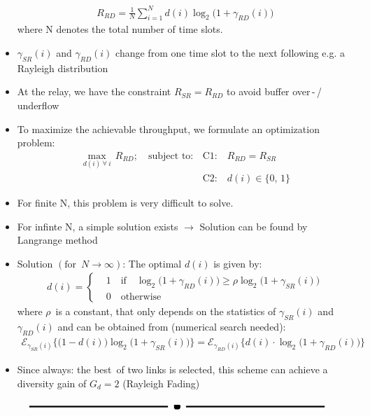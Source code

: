 \documentclass[a4paper, 10pt]{article}
\begin{document}
\begin{itemize}
	\begin{align*}
		R_{RD} = \frac{1}{N}\sum_{i=1}^{N}d(i)\log_2\bigl(1 + \gamma_{RD}(i)\bigr)
	\end{align*}
	where N denotes the total number of time slots.
	\item $\gamma_{SR}(i) $ and $ \gamma_{RD}(i) $ change from one time slot to the next following e.g. a Rayleigh distribution
	\item At the relay, we have the constraint $ R_{SR} = R_{RD} $ to avoid buffer over\,-\,/\,underflow
	\item To maximize the achievable throughput, we formulate an optimization problem:
	\begin{align*}
		\underset{d(i)\ \forall\ i}{\max}\, R_{RD};\quad
		\text{subject to:}\, &\text{C1:}\quad R_{RD} = R_{SR} \\
		&\text{C2:}\quad d(i) \in \{0,\,1\}
	\end{align*}
	\item For finite N, this problem is very difficult to solve.
	\item For infinte N, a simple solution exists $\rightarrow$ Solution can be found by Langrange method
	\item Solution $(\text{for }\, N \rightarrow \infty )$: The optimal $d(i) $ is given by:
	\begin{align*}
		d(i) = 
		\begin{cases}
			&1\quad \text{if}\quad \log_2\bigl( 1 + \gamma_{RD}(i)\bigr) \geq \rho \log_2\bigl( 1 + \gamma_{SR}(i)\bigr) \\
			&0\quad \text{otherwise} 
		\end{cases}
\end{align*}	 
	where $\rho $\, is a constant, that only depends on the statistics of $\gamma_{SR}(i) $ and $ \gamma_{RD}(i) $ and can be obtained from (numerical search needed):
	\begin{align*}
		\mathcal{E}_{\gamma_{SR}(i)}\bigl\{\bigl(1 - d(i)\bigr)\log_2\bigl(1 + \gamma_{SR}(i)\bigr)\bigr\} = \mathcal{E}_{\gamma_{RD}(i)}\bigl\{d(i)\cdot\log_2\bigl(1 + \gamma_{RD}(i)\bigr)\bigr\}
	\end{align*}
	\item Since always: the \glqq best\grqq\ of two links is selected, this scheme can achieve a diversity gain of $G_d = 2 $ (Rayleigh Fading)
\end{itemize}
\begin{figure}[ht]
	\centering
	\includegraphics[scale=1.4]{Ende}
\end{figure}
\end{document}
